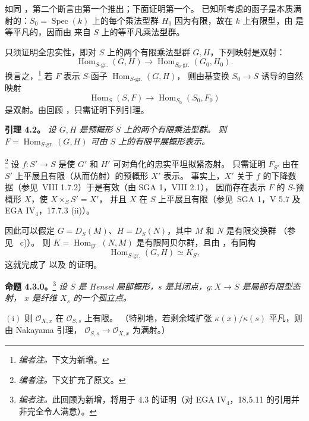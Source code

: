 如同 ，第二个断言由第一个推出；下面证明第一个。
已知所考虑的函子是本质满射的：\(S_0=\operatorname{Spec}(k)\) 上的每个乘法型群
\(H_0\) 因为有限，故在 \(k\) 上有限型，由 
是等平凡的，因而由  来自 \(S\) 上的等平凡乘法型群。

只须证明全忠实性，即对 \(S\) 上的两个有限乘法型群 \(G,H\)，下列映射是双射：
\[
  \operatorname{Hom}_{S\text{-gr.}}(G,H)
  \longrightarrow
  \operatorname{Hom}_{S_0\text{-gr.}}(G_0,H_0).
\]
换言之，\footnote{\textit{编者注。}下文为新增。}
若 \(F\) 表示 \(S\)-函子 \(\operatorname{Hom}_{S\text{-gr.}}(G,H)\)，
则由基变换 \(S_0\to S\) 诱导的自然映射
\[
  \operatorname{Hom}_S(S,F)
  \longrightarrow
  \operatorname{Hom}_{S_0}(S_0,F_0)
\]
是双射。由回顾 ，只需证明下列引理。

\par\medskip\noindent
\textbf{引理 4.2。}\enspace
\emph{设 \(G,H\) 是预概形 \(S\) 上的两个有限乘法型群。
则 \(F=\operatorname{Hom}_{S\text{-gr.}}(G,H)\) 可由 \(S\) 上的有限平展概形表示。}

\footnote{\textit{编者注。}下文扩充了原文。}
设 \(f:S'\to S\) 是使 \(G'\) 和 \(H'\) 可对角化的忠实平坦拟紧态射。
只需证明 \(F_{S'}\) 由在 \(S'\) 上平展且有限（从而仿射）的预概形 \(X'\) 表示。
事实上，\(X'\) 关于 \(f\) 的下降数据（参见\ VIII 1.7.2）于是有效（由 SGA 1，VIII 2.1），
因而存在表示 \(F\) 的 \(S\)-预概形 \(X\)，使 \(X\times_S S'=X'\)，
并且 \(X\) 在 \(S\) 上平展且有限（参见\ SGA 1，V 5.7 及 EGA IV\(_4\)，17.7.3 (ii)）。

因此可以假定 \(G=D_S(M)\)、\(H=D_S(N)\)，其中 \(M\) 和 \(N\) 是有限交换群
（参见\  c)）。
则 \(K=\operatorname{Hom}_{\mathrm{gr.}}(N,M)\) 是有限阿贝尔群，且由
，有同构
\[
  \operatorname{Hom}_{S\text{-gr.}}(G,H)\simeq K_S,
\]
这就完成了  以及
 的证明。

\par\medskip\noindent
\textbf{命题 4.3.0。}\footnote{\textit{编者注。}此回顾为新增，将用于 4.3 的证明（对 EGA IV\(_4\)，18.5.11 的引用并非完全令人满意）。}\enspace
\begingroup\itshape
设 \(S\) 是 Hensel 局部概形，\(s\) 是其闭点，\(g:X\to S\) 是局部有限型态射，
\(x\) 是纤维 \(X_s\) 的一个孤立点。

\smallskip
\noindent
\(\mathrm{(i)}\) 则 \(\mathcal O_{X,x}\) 在 \(\mathcal O_{S,s}\) 上有限。
（特别地，若剩余域扩张 \(\kappa(x)/\kappa(s)\) 平凡，则由 Nakayama 引理，
\(\mathcal O_{S,s}\to\mathcal O_{X,x}\) 为满射。）

